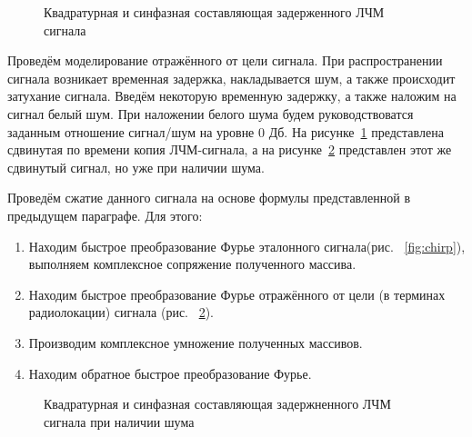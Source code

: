 \begin{figure}[h]
    \centering
    \noindent
    \caption{Квадратурная и синфазная составляющая задерженного ЛЧМ сигнала}
    \label{fig:chirp_shift}
\end{figure}

Проведём моделирование отражённого от цели сигнала. При распространении сигнала возникает временная задержка, накладывается шум, а также происходит затухание сигнала. Введём некоторую временную задержку, а также наложим на сигнал белый шум. При наложении белого шума будем руководствоватся заданным отношение сигнал/шум на уровне 0 Дб. На рисунке~\ref{fig:chirp_shift} представлена сдвинутая по времени копия ЛЧМ-сигнала, а на рисунке~\ref{fig:chirp_shift_noise} представлен этот же сдвинутый сигнал, но уже при наличии шума.  

Проведём сжатие данного сигнала на основе формулы представленной в предыдущем параграфе. Для этого:

\begin{enumerate}
	\item Находим быстрое преобразование Фурье эталонного сигнала(рис. ~\ref{fig:chirp}), выполняем комплексное сопряжение полученного массива.
	\item Находим быстрое преобразование Фурье отражённого от цели (в терминах радиолокации) сигнала (рис. ~\ref{fig:chirp_shift_noise}).
	\item Производим комплексное умножение полученных массивов.
	\item Находим обратное быстрое преобразование Фурье.
\end{enumerate}

\begin{figure}[h]
    \centering
    \noindent
    \caption{Квадратурная и синфазная составляющая задержненного ЛЧМ сигнала при наличии шума}
    \label{fig:chirp_shift_noise}
\end{figure}

